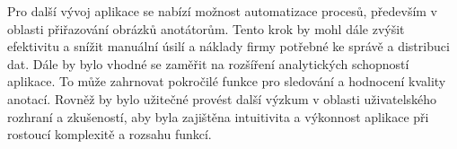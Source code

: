 Pro další vývoj aplikace se nabízí možnost automatizace procesů, především v oblasti přiřazování obrázků anotátorům. Tento krok by mohl dále zvýšit efektivitu a snížit manuální úsilí a náklady firmy potřebné ke správě a distribuci dat. Dále by bylo vhodné se zaměřit na rozšíření analytických schopností aplikace. To může zahrnovat pokročilé funkce pro sledování a hodnocení kvality anotací. Rovněž by bylo užitečné provést další výzkum v oblasti uživatelského rozhraní a zkušeností, aby byla zajištěna intuitivita a výkonnost aplikace při rostoucí komplexitě a rozsahu funkcí.
